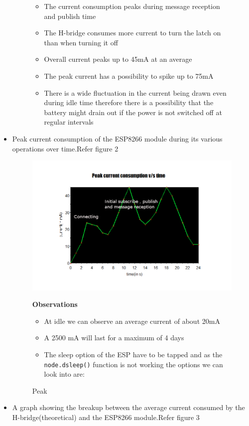 \documentclass[16pt]{article}
\begin{document}
\begin{itemize}
\begin{figure}
\begin{itemize}
  \item
    The current consumption peaks during message reception and publish
    time
  \item
    The H-bridge consumes more current to turn the latch on than when
    turning it off
  \item
    Overall current peaks up to 45mA at an average
  \item
    The peak current has a possibility to spike up to 75mA
  \item
    There is a wide fluctuation in the current being drawn even during
    idle time therefore there is a possibility that the battery might
    drain out if the power is not switched off at regular intervals
  \end{itemize}
\end{figure}


\item
  Peak current consumption of the ESP8266 module during its various
  operations over time.Refer figure 2 

\begin{figure}
\includegraphics[width=1.2\textwidth]{images/peak_current1.png}
\caption{Peak}
\textbf{Observations}

\begin{itemize}

\item
  At idle we can observe an average current of about 20mA
\item
  A 2500 mA will last for a maximum of 4 days
\item
  The sleep option of the ESP have to be tapped and as the \\
 \texttt{node.dsleep()} function is not working the options we can look
  into are:
\end{itemize}
\end{figure}

  
\item
  A graph showing the breakup between the average current consumed by
  the H-bridge(theoretical) and the ESP8266 module.Refer figure 3
\end{itemize}
\end{document}
